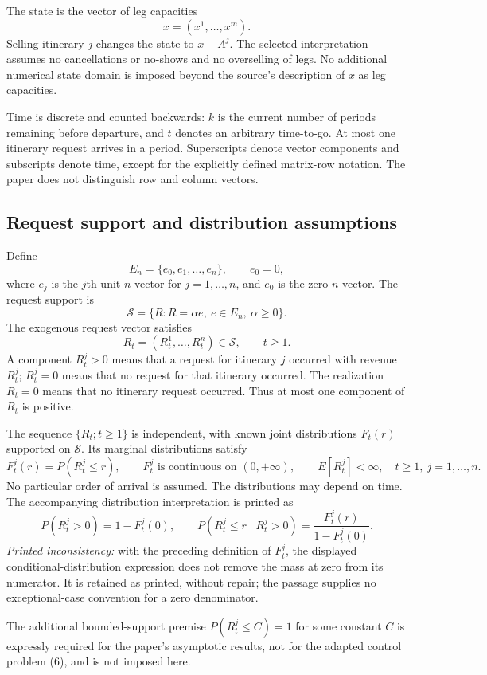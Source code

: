 \documentclass{article}
\begin{document}
The state is the vector of leg capacities
\[
x=(x^1,\ldots,x^m).
\]
Selling itinerary $j$ changes the state to $x-A^j$. The selected interpretation assumes no cancellations or no-shows and no overselling of legs. No additional numerical state domain is imposed beyond the source's description of $x$ as leg capacities.

Time is discrete and counted backwards: $k$ is the current number of periods remaining before departure, and $t$ denotes an arbitrary time-to-go. At most one itinerary request arrives in a period. Superscripts denote vector components and subscripts denote time, except for the explicitly defined matrix-row notation. The paper does not distinguish row and column vectors.

\subsection*{Request support and distribution assumptions}
Define
\[
E_n=\{e_0,e_1,\ldots,e_n\},
\qquad e_0=0,
\]
where $e_j$ is the $j$th unit $n$-vector for $j=1,\ldots,n$, and $e_0$ is the zero $n$-vector. The request support is
\[
\mathcal{S}=\{R:R=\alpha e,\ e\in E_n,\ \alpha\geq0\}.
\]
The exogenous request vector satisfies
\[
R_t=(R_t^1,\ldots,R_t^n)\in\mathcal{S},\qquad t\geq1.
\]
A component $R_t^j>0$ means that a request for itinerary $j$ occurred with revenue $R_t^j$; $R_t^j=0$ means that no request for that itinerary occurred. The realization $R_t=0$ means that no itinerary request occurred. Thus at most one component of $R_t$ is positive.

The sequence $\{R_t;t\geq1\}$ is independent, with known joint distributions $F_t(r)$ supported on $\mathcal{S}$. Its marginal distributions satisfy
\[
F_t^j(r)=P(R_t^j\leq r),\qquad
F_t^j\text{ is continuous on }(0,+\infty),\qquad
E[R_t^j]<\infty,
\quad t\geq1,\ j=1,\ldots,n.
\]
No particular order of arrival is assumed. The distributions may depend on time. The accompanying distribution interpretation is printed as
\[
P(R_t^j>0)=1-F_t^j(0),
\qquad
P(R_t^j\leq r\mid R_t^j>0)
=\frac{F_t^j(r)}{1-F_t^j(0)}.
\]
\emph{Printed inconsistency:} with the preceding definition of $F_t^j$, the displayed conditional-distribution expression does not remove the mass at zero from its numerator. It is retained as printed, without repair; the passage supplies no exceptional-case convention for a zero denominator.

The additional bounded-support premise $P(R_t^j\leq C)=1$ for some constant $C$ is expressly required for the paper's asymptotic results, not for the adapted control problem (6), and is not imposed here.
\end{document}
